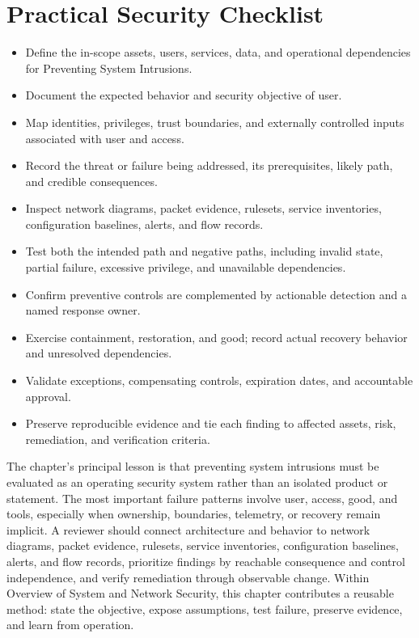 \documentclass[11pt]{article}
\begin{document}
\section*{Practical Security Checklist}
\begin{itemize}[label=$\square$]
\item Define the in-scope assets, users, services, data, and operational dependencies for Preventing System Intrusions.
\item Document the expected behavior and security objective of user.
\item Map identities, privileges, trust boundaries, and externally controlled inputs associated with user and access.
\item Record the threat or failure being addressed, its prerequisites, likely path, and credible consequences.
\item Inspect network diagrams, packet evidence, rulesets, service inventories, configuration baselines, alerts, and flow records.
\item Test both the intended path and negative paths, including invalid state, partial failure, excessive privilege, and unavailable dependencies.
\item Confirm preventive controls are complemented by actionable detection and a named response owner.
\item Exercise containment, restoration, and good; record actual recovery behavior and unresolved dependencies.
\item Validate exceptions, compensating controls, expiration dates, and accountable approval.
\item Preserve reproducible evidence and tie each finding to affected assets, risk, remediation, and verification criteria.
\end{itemize}
\begin{synthesisbox}
The chapter's principal lesson is that preventing system intrusions must be evaluated as an operating security system rather than an isolated product or statement. The most important failure patterns involve user, access, good, and tools, especially when ownership, boundaries, telemetry, or recovery remain implicit. A reviewer should connect architecture and behavior to network diagrams, packet evidence, rulesets, service inventories, configuration baselines, alerts, and flow records, prioritize findings by reachable consequence and control independence, and verify remediation through observable change. Within Overview of System and Network Security, this chapter contributes a reusable method: state the objective, expose assumptions, test failure, preserve evidence, and learn from operation.
\end{synthesisbox}
\end{document}
